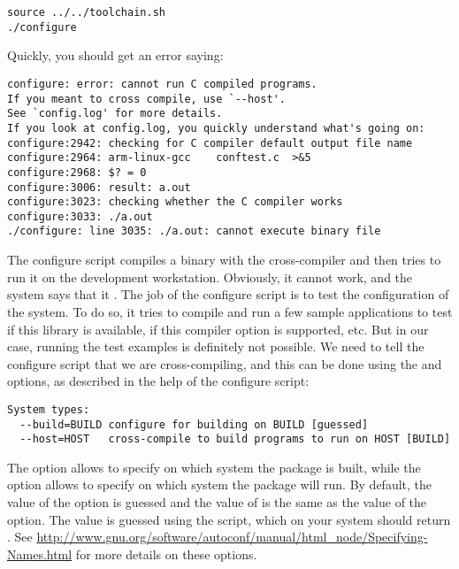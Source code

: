 \begin{verbatim}
source ../../toolchain.sh
./configure
\end{verbatim}

Quickly, you should get an error saying:

\begin{verbatim}
configure: error: cannot run C compiled programs.
If you meant to cross compile, use `--host'.
See `config.log' for more details.
If you look at config.log, you quickly understand what's going on:
configure:2942: checking for C compiler default output file name
configure:2964: arm-linux-gcc    conftest.c  >&5
configure:2968: $? = 0
configure:3006: result: a.out
configure:3023: checking whether the C compiler works
configure:3033: ./a.out
./configure: line 3035: ./a.out: cannot execute binary file
\end{verbatim}

The configure script compiles a binary with the cross-compiler and
then tries to run it on the development workstation. Obviously, it
cannot work, and the system says that it
. The job of the configure script is
to test the configuration of the system. To do so, it tries to compile
and run a few sample applications to test if this library is
available, if this compiler option is supported, etc. But in our case,
running the test examples is definitely not possible. We need to tell
the configure script that we are cross-compiling, and this can be done
using the  and  options, as described in
the help of the configure script:

\begin{verbatim}
System types:
  --build=BUILD	configure for building on BUILD [guessed]
  --host=HOST	cross-compile to build programs to run on HOST [BUILD]
\end{verbatim}

The  option allows to specify on which system the
package is built, while the  option allows to specify on
which system the package will run. By default, the value of the
 option is guessed and the value of  is the
same as the value of the  option. The value is guessed
using the  script, which on your system should
return . See
\url{http://www.gnu.org/software/autoconf/manual/html_node/Specifying-Names.html}
for more details on these options.

\clearpage

